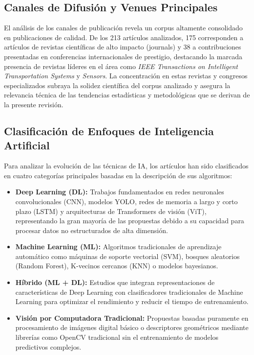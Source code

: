 \subsection{Canales de Difusión y Venues Principales}
El análisis de los canales de publicación revela un corpus altamente consolidado en publicaciones de calidad. De los 213 artículos analizados, 175 corresponden a artículos de revistas científicas de alto impacto (journals) y 38 a contribuciones presentadas en conferencias internacionales de prestigio, destacando la marcada presencia de revistas líderes en el área como \textit{IEEE Transactions on Intelligent Transportation Systems} y \textit{Sensors}. La concentración en estas revistas y congresos especializados subraya la solidez científica del corpus analizado y asegura la relevancia técnica de las tendencias estadísticas y metodológicas que se derivan de la presente revisión.

\subsection{Clasificación de Enfoques de Inteligencia Artificial}
Para analizar la evolución de las técnicas de IA, los artículos han sido clasificados en cuatro categorías principales basadas en la descripción de sus algoritmos:
\begin{itemize}
    \item \textbf{Deep Learning (DL):} Trabajos fundamentados en redes neuronales convolucionales (CNN), modelos YOLO, redes de memoria a largo y corto plazo (LSTM) y arquitecturas de Transformers de visión (ViT), representando la gran mayoría de las propuestas debido a su capacidad para procesar datos no estructurados de alta dimensión.
    \item \textbf{Machine Learning (ML):} Algoritmos tradicionales de aprendizaje automático como máquinas de soporte vectorial (SVM), bosques aleatorios (Random Forest), K-vecinos cercanos (KNN) o modelos bayesianos.
    \item \textbf{Híbrido (ML + DL):} Estudios que integran representaciones de características de Deep Learning con clasificadores tradicionales de Machine Learning para optimizar el rendimiento y reducir el tiempo de entrenamiento.
    \item \textbf{Visión por Computadora Tradicional:} Propuestas basadas puramente en procesamiento de imágenes digital básico o descriptores geométricos mediante librerías como OpenCV tradicional sin el entrenamiento de modelos predictivos complejos.
\end{itemize}

